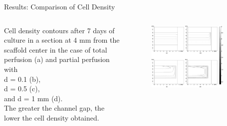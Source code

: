 \documentclass[11pt,t]{beamer}
\begin{document}
\begin{frame}[fragile]{Results: Comparison of Cell Density}  

	\begin{columns}[t]
		\begin{column}{.4\textwidth}
Cell density contours after 7 days of culture in a section at 4 mm from the scaffold center in the case of total perfusion (a) and partial perfusion
with\\ d = 0.1 (b), \\d = 0.5 (c), \\and d = 1 mm (d).\\The greater the channel gap, the lower the cell density obtained.
	
 
		\end{column}
		\begin{column}{.6\textwidth}
			\vspace{-25pt}
			\begin{figure}
			\centering
			\includegraphics[width=0.85\textwidth]{math_comp2}
			
			\end{figure}
		\end{column}
	\end{columns}	
		
\end{frame}
\end{document}
